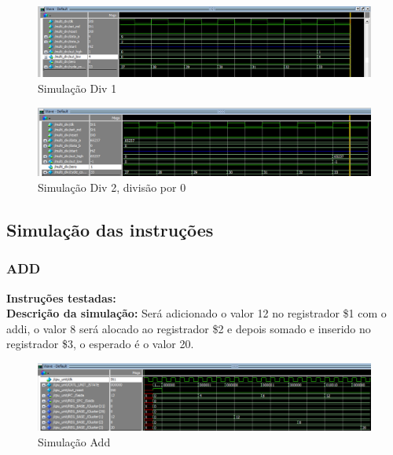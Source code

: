 \begin{figure}[htbp!]
\centering
\includegraphics[width=1\textwidth]{figure/simulacao_div_1.png}
\caption{Simulação Div 1} 
\label{fig:imagem_massa}
\end{figure}

\begin{figure}[htbp!]
\centering
\includegraphics[width=1\textwidth]{figure/simulacao_div_2.png}
\caption{Simulação Div 2, divisão por 0} 
\label{fig:imagem_massa}
\end{figure}

\newpage

\subsection{Simulação das instruções}

\subsubsection{ADD}
\textbf{Instruções testadas:}
 \\

 \textbf{Descrição da simulação:} Será adicionado o valor 12 no registrador \$1 com o addi, o valor 8 será alocado ao registrador \$2 e depois somado e inserido no registrador \$3, o esperado é o valor 20.\\

\begin{figure}[htbp!]
\centering
\includegraphics[width=1\textwidth]{figure/simulacao_add.png}
\caption{Simulação Add} 
\label{fig:imagem_massa}
\end{figure}

